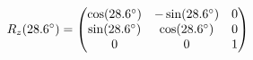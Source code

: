 \documentclass[preview]{standalone}
\begin{document}
\begin{align*}
\special{dvisvgm:raw <g id='unique000'>}R_z(28.6^\circ) = \begin{pmatrix} \cos(28.6^\circ) & -\sin(28.6^\circ) & 0 \\ \sin(28.6^\circ) & \cos(28.6^\circ) & 0 \\ 0 & 0 & 1 \end{pmatrix}\special{dvisvgm:raw </g>}
\end{align*}
\end{document}
